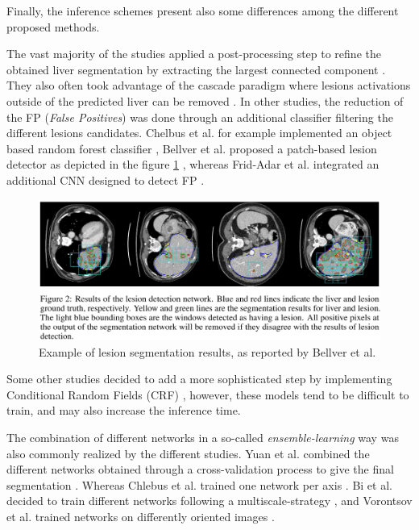 \documentclass[]{article}
\begin{document}
	
	Finally, the inference schemes present also some differences among the
	different proposed methods.
	
	The vast majority of the studies applied a post-processing step to
	refine the obtained liver segmentation by extracting the largest
	connected component \cite{Li2018, Han2017, Yuan2017, Bellver2017, Kaluva2018}. They
	also often took advantage of the cascade paradigm where lesions
	activations outside of the predicted liver can be removed \cite{Li2018, Yuan2017, Vorontsov2018}. In other studies, the reduction of the FP
	(\emph{False Positives}) was done through an additional classifier
	filtering the different lesions candidates. Chelbus et al. for
	example implemented an object based random forest classifier \cite{Chlebus2018},
	Bellver et al. proposed a patch-based lesion detector as
	depicted in the figure \ref{Bellver_predResults} \cite{Bellver2017}, whereas Frid-Adar et al. integrated an
	additional CNN designed to detect FP \cite{Frid-adar2017}.
	
	\begin{figure}[th!]
		\centering
		\includegraphics[width=0.7\linewidth]{images/image25}
		\caption{Example of lesion segmentation results, as reported by Bellver et al. \cite{Bellver2017}}
		\label{Bellver_predResults}
	\end{figure}
	
	
	Some other studies decided to add a more sophisticated step by
	implementing Conditional Random Fields (CRF) \cite{Christ2017, Rafiei2018, Dou2016}, however, these models
	tend to be difficult to train, and may also
	increase the inference time.
	
	The combination of different networks in a so-called
	\emph{ensemble-learning} way was also commonly realized by the different
	studies. Yuan et al. combined the different networks obtained
	through a cross-validation process to give the final segmentation \cite{Yuan2017}.
	Whereas Chlebus et al. trained one network per axis \cite{Chlebus2018}. Bi et al. decided to train different networks following a
	multiscale-strategy \cite{Bi2017}, and Vorontsov et al. trained networks on
	differently oriented images \cite{Vorontsov2018}.
	
\end{document}
